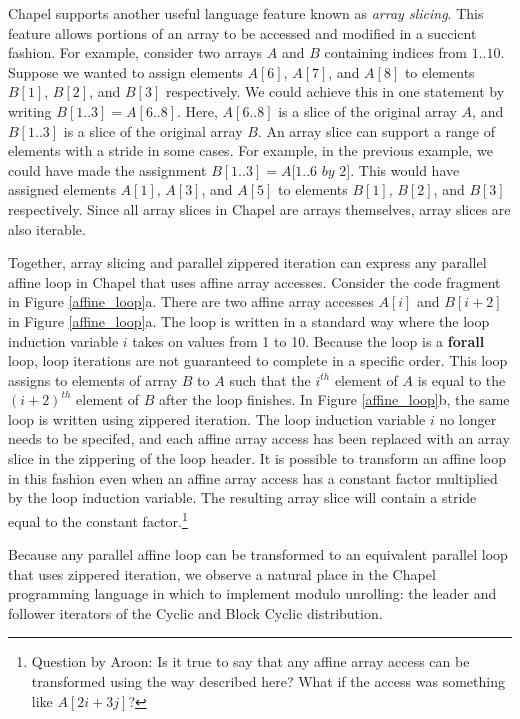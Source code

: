 Chapel supports another useful language feature known as \textit{array slicing}. This feature allows portions of an array to be accessed and modified in a succicnt fashion. For example, consider two arrays $A$ and $B$ containing indices from $1..10$. Suppose we wanted to assign elements $A[6]$, $A[7]$, and $A[8]$ to elements $B[1]$, $B[2]$, and $B[3]$ respectively. We could achieve this in one statement by writing $B[1..3] = A[6..8]$. Here, $A[6..8]$ is a slice of the original array $A$, and $B[1..3]$ is a slice of the original array $B$. An array slice can support a range of elements with a stride in some cases. For example, in the previous example, we could have made the assignment $B[1..3] = A[1..6$  $by$  $2]$. This would have assigned elements $A[1]$, $A[3]$, and $A[5]$ to elements $B[1]$, $B[2]$, and $B[3]$ respectively. Since all array slices in Chapel are arrays themselves, array slices are also iterable. 

Together, array slicing and parallel zippered iteration can express any parallel affine loop in Chapel that uses affine array accesses. Consider the code fragment in Figure \ref{affine_loop}a. There are two affine array accesses $A[i]$ and $B[i+2]$ in Figure \ref{affine_loop}a. The loop is written in a standard way where the loop induction variable $i$ takes on values from 1 to 10. Because the loop is a \textbf{forall} loop, loop iterations are not guaranteed to complete in a specific order. This loop assigns to elements of array $B$ to $A$ such that the $i^{th}$ element of $A$ is equal to the $(i+2)^{th}$ element of $B$ after the loop finishes. In Figure \ref{affine_loop}b, the same loop is written using zippered iteration. The loop induction variable $i$ no longer needs to be specifed, and each affine array access has been replaced with an array slice in the zippering of the loop header. It is possible to transform an affine loop in this fashion even when an affine array access has a constant factor multiplied by the loop induction variable. The resulting array slice will contain a stride equal to the constant factor.\footnote{Question by Aroon: Is it true to say that any affine array access can be transformed using the way described here? What if the access was something like $A[2i+3j]$?}

Because any parallel affine loop can be transformed to an equivalent parallel loop that uses zippered iteration, we observe a natural place in the Chapel programming language in which to implement modulo unrolling: the leader and follower iterators of the Cyclic and Block Cyclic distribution. 



